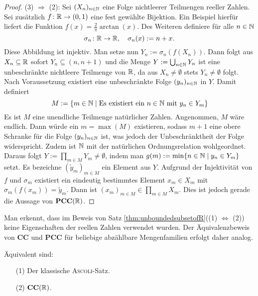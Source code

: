 \begin{proof}
  (3) $\Rightarrow$ (2):
  Sei $(X_n)_{n \in \mathbb{N}}$ eine Folge nichtleerer Teilmengen reeller Zahlen.
  Sei zusätzlich $f \colon \mathbb{R} \to (0,1)$ eine fest gewählte Bijektion.
  Ein Beispiel hierfür liefert die Funktion $f(x) = \frac{2}{\pi}\arctan(x)$.
  Des Weiteren definiere für alle $n \in \mathbb{N}$
  \begin{displaymath}
    \sigma_n \colon \mathbb{R} \to \mathbb{R}, \quad \sigma_n(x) := n + x.
  \end{displaymath}
  Diese Abbildung ist injektiv.
  Man setze nun $Y_n := \sigma_n(f(X_n))$. 
  Dann folgt aus $X_n \subseteq \mathbb{R}$ sofort $Y_n \subseteq (n,n+1)$ und die Menge $Y:= \bigcup_{n \in \mathbb{N}} Y_n$ ist eine unbeschränkte nichtleere Teilmenge von $\mathbb{R}$, da aus $X_n \neq \emptyset$ stets $Y_n \neq \emptyset$ folgt.
  Nach Voraussetzung existiert eine unbeschränkte Folge $(y_n)_{n \in \mathbb{N}}$ in $Y$.
  Damit definiert
  \begin{displaymath}
    M := \{m \in \mathbb{N} \mid \text{Es existiert ein } n \in \mathbb{N} \text{ mit } y_n \in Y_m\}
  \end{displaymath}
  Es ist $M$ eine unendliche Teilmenge natürlicher Zahlen.
  Angenommen, $M$ wäre endlich.
  Dann würde ein $m = \max(M)$ existieren, sodass $m + 1$ eine obere Schranke für die Folge $(y_n)_{n \in \mathbb{N}}$ ist, was jedoch der Unbeschränktheit der Folge widerspricht.
  Zudem ist $\mathbb{N}$ mit der natürlichen Ordnungsrelation wohlgeordnet.
  Daraus folgt $Y := \prod_{m \in M} Y_m \neq \emptyset$, indem man $g(m) := \min\{n \in \mathbb{N} \mid y_n \in Y_m\}$ setzt.
  Es bezeichne $(\tilde{y}_m)_{m \in M}$ ein Element aus $Y$.
  Aufgrund der Injektivität von $f$ und $\sigma_m$ existiert ein eindeutig bestimmtes Element $x_m \in X_m$ mit $\sigma_m(f(x_m)) = \tilde{y}_m$.
  Dann ist $(x_m)_{m \in M} \in \prod_{m \in M} X_m$.
  Dies ist jedoch gerade die Aussage von $\mathbf{PCC}(\mathbb{R})$.
\end{proof}

\begin{bem}
  Man erkennt, dass im Beweis von Satz \ref{thm:unboundedsubsetofR}((1) $\Leftrightarrow$ (2)) keine Eigenschaften der reellen Zahlen verwendet wurden. Der Äquivalenzbeweis von $\mathbf{CC}$ und $\mathbf{PCC}$ für beliebige abzählbare Mengenfamilien erfolgt daher analog.
\end{bem}

\begin{thm}
  \label{thm:classicalascoli}
  Äquivalent sind:
  \begin{enumerate}
    \item[(1)] Der klassische \textsc{Ascoli}-Satz.
    \item[(2)] $\mathbf{CC}(\mathbb{R})$.
  \end{enumerate}
\end{thm}

